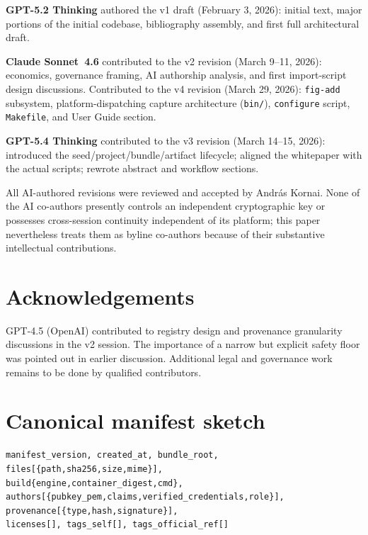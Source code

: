 \documentclass[11pt]{article}
\begin{document}
\textbf{GPT-5.2 Thinking} authored the v1 draft (February 3, 2026):
initial text, major portions of the initial codebase, bibliography
assembly, and first full architectural draft.

\textbf{Claude Sonnet~4.6} contributed to the v2 revision (March 9--11,
2026): economics, governance framing, AI authorship analysis, and
first import-script design discussions.
Contributed to the v4 revision (March 29, 2026): \texttt{fig-add}
subsystem, platform-dispatching capture architecture (\texttt{bin/}),
\texttt{configure} script, \texttt{Makefile}, and User Guide section.

\textbf{GPT-5.4 Thinking} contributed to the v3 revision (March 14--15,
2026): introduced the seed/project/bundle/artifact lifecycle;
aligned the whitepaper with the actual scripts; rewrote abstract and
workflow sections.

All AI-authored revisions were reviewed and accepted by Andr\'as Kornai.
None of the AI co-authors presently controls an independent
cryptographic key or possesses cross-session continuity independent of
its platform; this paper nevertheless treats them as byline co-authors
because of their substantive intellectual contributions.

\section*{Acknowledgements}

GPT-4.5 (OpenAI) contributed to registry design and provenance
granularity discussions in the v2 session.
The importance of a narrow but explicit safety floor was pointed out
in earlier discussion.
Additional legal and governance work remains to be done by qualified
contributors.

\appendix
\section{Canonical manifest sketch}

\begin{lstlisting}
manifest_version, created_at, bundle_root,
files[{path,sha256,size,mime}],
build{engine,container_digest,cmd},
authors[{pubkey_pem,claims,verified_credentials,role}],
provenance[{type,hash,signature}],
licenses[], tags_self[], tags_official_ref[]
\end{lstlisting}
\end{document}
